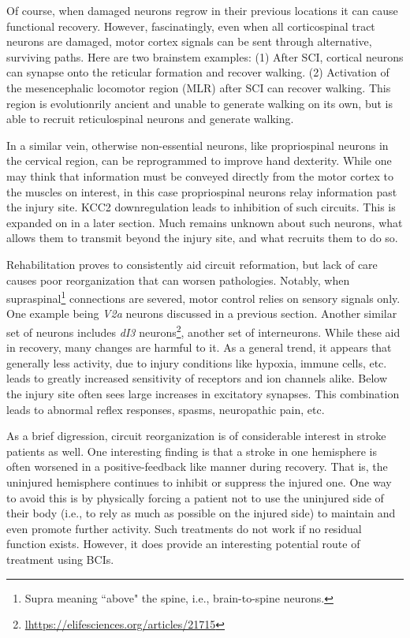 Of course, when damaged neurons regrow in their previous locations it can cause functional recovery. However, fascinatingly, even when all corticospinal tract neurons are damaged, motor cortex signals can be sent through alternative, surviving paths. Here are two brainstem examples: (1) After SCI, cortical neurons can synapse onto the reticular formation and recover walking. (2) Activation of the mesencephalic locomotor region (MLR) after SCI can recover walking. This region is evolutionrily ancient and unable to generate walking on its own, but is able to recruit reticulospinal neurons and generate walking.\newline

In a similar vein, otherwise non-essential neurons, like propriospinal neurons in the cervical region, can be reprogrammed to improve hand dexterity. While one may think that information must be conveyed directly from the motor cortex to the muscles on interest, in this case propriospinal neurons relay information past the injury site. KCC2 downregulation leads to inhibition of such circuits. This is expanded on in a later section. Much remains unknown about such neurons, what allows them to transmit beyond the injury site, and what recruits them to do so.\newline

Rehabilitation proves to consistently aid circuit reformation, but lack of care causes poor reorganization that can worsen pathologies. Notably, when supraspinal\footnote{Supra meaning ``above" the spine, i.e., brain-to-spine neurons.} connections are severed, motor control relies on sensory signals only. One example being \textit{V2a} neurons discussed in a previous section. Another similar set of neurons includes \textit{dI3} neurons\footnote{\url{lhttps://elifesciences.org/articles/21715}}, another set of interneurons. While these aid in recovery, many changes are harmful to it. As a general trend, it appears that generally less activity, due to injury conditions like hypoxia, immune cells, etc. leads to greatly increased sensitivity of receptors and ion channels alike. Below the injury site often sees large increases in excitatory synapses. This combination leads to abnormal reflex responses, spasms, neuropathic pain, etc.\newline

As a brief digression, circuit reorganization is of considerable interest in stroke patients as well. One interesting finding is that a stroke in one hemisphere is often worsened in a positive-feedback like manner during recovery. That is, the uninjured hemisphere continues to inhibit or suppress the injured one. One way to avoid this is by physically forcing a patient not to use the uninjured side of their body (i.e., to rely as much as possible on the injured side) to maintain and even promote further activity. Such treatments do not work if no residual function exists. However, it does provide an interesting potential route of treatment using BCIs. 

